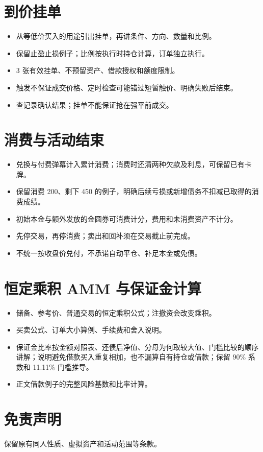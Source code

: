 \section{到价挂单}
\begin{itemize}
  \item 从等低价买入的用途引出挂单，再讲条件、方向、数量和比例。
  \item 保留止盈止损例子；比例按执行时持仓计算，订单独立执行。
  \item 3 张有效挂单、不预留资产、借款授权和额度限制。
  \item 触发不保证成交价格、定时检查可能错过短暂触价、明确失败后结束。
  \item 查记录确认结果；挂单不能保证抢在强平前成交。
\end{itemize}

\section{消费与活动结束}
\begin{itemize}
  \item 兑换与付费弹幕计入累计消费；消费时还清两种欠款及利息，可保留已有卡牌。
  \item 保留消费 200、剩下 450 的例子，明确后续亏损或新增债务不扣减已取得的消费成绩。
  \item 初始本金与额外发放的金圆券可消费计分，费用和未消费资产不计分。
  \item 先停交易，再停消费；卖出和回补须在交易截止前完成。
  \item 不统一按收盘价兑付，不承诺自动平仓、补足本金或免债。
\end{itemize}

\appendix
\section{恒定乘积 AMM 与保证金计算}
\begin{itemize}
  \item 储备、参考价、普通交易的恒定乘积公式；注撤资会改变乘积。
  \item 买卖公式、订单大小算例、手续费和舍入说明。
  \item 保证金比率按金额对照表、还债后净值、分母为何取较大值、门槛比较的顺序讲解；说明避免借款买入重复相加，也不漏算自有持仓或借款；保留 90\% 系数和 11.11\% 门槛推导。
  \item 正文借款例子的完整风险基数和比率计算。
\end{itemize}

\section*{免责声明}
保留原有同人性质、虚拟资产和活动范围等条款。

